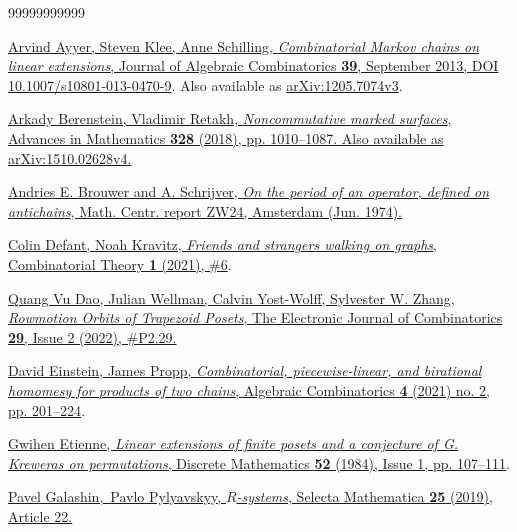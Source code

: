 \documentclass[numbers=enddot,12pt,final,onecolumn,notitlepage]{scrartcl}%
\theoremstyle{definition}
\begin{document}
\begin{thebibliography}{99999999999}                                                                                      %


%
\href{https://doi.org/10.1007/s10801-013-0470-9}{Arvind Ayyer, Steven Klee,
Anne Schilling, \textit{Combinatorial Markov chains on linear extensions},
Journal of Algebraic Combinatorics \textbf{39}, September 2013, DOI
10.1007/s10801-013-0470-9}. Also available as
\href{https://arxiv.org/abs/1205.7074v3}{arXiv:1205.7074v3}.

\href{https://arxiv.org/abs/1510.02628v4}{Arkady
Berenstein, Vladimir Retakh, \textit{Noncommutative marked surfaces}, Advances
in Mathematics \textbf{328} (2018), pp. 1010--1087. Also available as
arXiv:1510.02628v4.}

%
\href{http://www.win.tue.nl/~aeb/preprints/zw24.pdf}{Andries E. Brouwer and A.
Schrijver, \textit{On the period of an operator, defined on antichains}, Math.
Centr. report ZW24, Amsterdam (Jun. 1974).}

\href{https://doi.org/10.5070/C61055363}{Colin
Defant, Noah Kravitz, \textit{Friends and strangers walking on graphs},
Combinatorial Theory \textbf{1} (2021), \#6}.

\href{https://doi.org/10.37236/9769}{Quang Vu Dao,
Julian Wellman, Calvin Yost-Wolff, Sylvester W. Zhang, \textit{Rowmotion
Orbits of Trapezoid Posets}, The Electronic Journal of Combinatorics
\textbf{29}, Issue 2 (2022), \#P2.29.}

%
\href{https://doi.org/10.5802/alco.139}{David Einstein, James Propp,
\textit{Combinatorial, piecewise-linear, and birational homomesy for products
of two chains}, Algebraic Combinatorics \textbf{4} (2021) no. 2, pp. 201--224}.

%
\href{https://doi.org/10.1016/0012-365X(84)90108-0}{Gwihen Etienne,
\textit{Linear extensions of finite posets and a conjecture of G. Kreweras on
permutations}, Discrete Mathematics \textbf{52} (1984), Issue 1, pp. 107--111}.

%
\href{https://doi.org/10.1007/s00029-019-0470-2}{Pavel Galashin,\ Pavlo
Pylyavskyy, $R$\textit{-systems}, Selecta Mathematica \textbf{25} (2019),
Article 22.}


\end{thebibliography}
\end{document}
